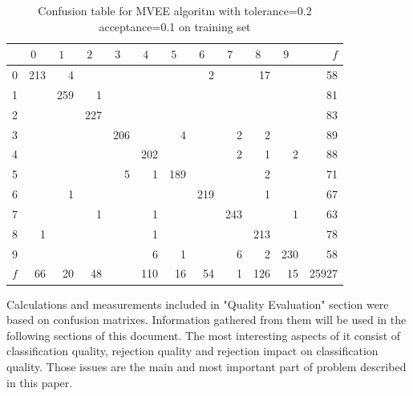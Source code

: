 \documentclass{llncs}
\begin{document}
\begin{table}[h]
\centering
\caption{Confusion table for MVEE algoritm with tolerance=0.2 acceptance=0.1 on training set}
\setlength{\tabcolsep}{3pt}
\renewcommand{\arraystretch}{1}

{\small
\begin{tabular}{|c||r|r|r|r|r|r|r|r|r|r|r|}
\hline
 \hspace{15pt} & $0\;\;\;$ & $1\;\;\;$ & $2\;\;\;$ & $3\;\;\;$ & $4\;\;\;$ & $5\;\;\;$ & $6\;\;\;$ & $7\;\;\;$ & $8\;\;\;$ & $9\;\;\;$ & $f$ \\
\hline\hline
  0 & 213 & 4 &   &   &   &   & 2 &   & 17 &   & 58\\
\hline
  1 &  & 259 & 1 &   &   &   &   &   &   &   & 81\\
\hline
  2 &  &   & 227 &   &   &   &   &   &   &   & 83\\
\hline
  3 &  &   &   & 206 &   & 4 &   & 2 & 2 &   & 89\\
\hline
  4 &  &   &   &   & 202 &   &   & 2 & 1 & 2 & 88\\
\hline
  5 &  &   &   & 5 & 1 & 189 &   &   & 2 &   & 71\\
\hline
  6 &  & 1 &   &   &   &   & 219 &   & 1 &   & 67\\
\hline
  7 &  &   & 1 &   & 1 &   &   & 243 &   & 1 & 63\\
\hline
  8 & 1 &   &   &   & 1 &   &   &   & 213 &   & 78\\
\hline
  9 &  &   &   &   & 6 & 1 &   & 6 & 2 & 230 & 58\\
\hline
$f$ & 66 & 20 & 48 &   & 110  & 16 & 54 & 1 & 126 & 15 & 25927\\
\hline
\end{tabular}
}

\label{tab:CofusionTable}
\end{table}

Calculations and measurements included in "Quality Evaluation" section were based on confusion matrixes. Information gathered from them will be used in the following sections of this document. The most interesting aspects of it consist of classification quality, rejection quality and rejection impact on classification quality. Those issues are the main and most important part of problem described in this paper.

\end{document}
